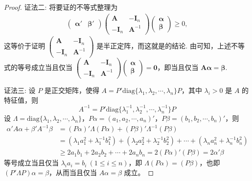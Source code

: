 \documentclass[../../main.tex]{subfiles}%
\begin{document}
\begin{proof}
{\color{blue}证法二:}
将要证的不等式整理为
\begin{align*}
\begin{pmatrix}
\boldsymbol{\alpha}' & \boldsymbol{\beta}'
\end{pmatrix}
\begin{pmatrix}
\boldsymbol{A} & -\boldsymbol{I}_n \\
-\boldsymbol{I}_n & \boldsymbol{A}^{-1}
\end{pmatrix}
\begin{pmatrix}
\boldsymbol{\alpha} \\
\boldsymbol{\beta}
\end{pmatrix} \geqslant  0,
\end{align*}
这等价于证明 $\begin{pmatrix}
\boldsymbol{A} & -\boldsymbol{I}_n \\
-\boldsymbol{I}_n & \boldsymbol{A}^{-1}
\end{pmatrix}$ 是半正定阵，而这就是的结论. 由可知，上述不等式的等号成立当且仅当 $\begin{pmatrix}
\boldsymbol{A} & -\boldsymbol{I}_n \\
-\boldsymbol{I}_n & \boldsymbol{A}^{-1}
\end{pmatrix}
\begin{pmatrix}
\boldsymbol{\alpha} \\
\boldsymbol{\beta}
\end{pmatrix}=\boldsymbol{0}$，即当且仅当 $\boldsymbol{A}\boldsymbol{\alpha}=\boldsymbol{\beta}$.

{\color{blue}证法三:}
设 \(P\) 是正交矩阵，使得 \(A = P'\mathrm{diag}\{\lambda_1,\lambda_2,\cdots,\lambda_n\}P\)，其中 \(\lambda_i > 0\) 是 \(A\) 的特征值，则
\[
A^{-1} = P'\mathrm{diag}\{\lambda_1^{-1},\lambda_2^{-1},\cdots,\lambda_n^{-1}\}P
\]
设 \(\Lambda = \mathrm{diag}\{\lambda_1,\lambda_2,\cdots,\lambda_n\}\)，\(P\alpha = (a_1,a_2,\cdots,a_n)'\)，\(P\beta = (b_1,b_2,\cdots,b_n)'\)，则
\begin{align*}
\alpha'A\alpha + \beta'A^{-1}\beta &= (P\alpha)'\Lambda(P\alpha) + (P\beta)'\Lambda^{-1}(P\beta)\\
&= (\lambda_1a_1^2 + \lambda_1^{-1}b_1^2) + (\lambda_2a_2^2 + \lambda_2^{-1}b_2^2) + \cdots + (\lambda_na_n^2 + \lambda_n^{-1}b_n^2)\\
&\geqslant  2a_1b_1 + 2a_2b_2 + \cdots + 2a_nb_n = 2(P\alpha)'(P\beta) = 2\alpha'\beta
\end{align*}
等号成立当且仅当 \(\lambda_ia_i = b_i\ (1\leqslant  i \leqslant  n)\)，即 \(\Lambda(P\alpha) = (P\beta)\)，也即 \((P'\Lambda P)\alpha = \beta\)，从而当且仅当 \(A\alpha = \beta\) 成立。 
\end{proof}
\end{document}
